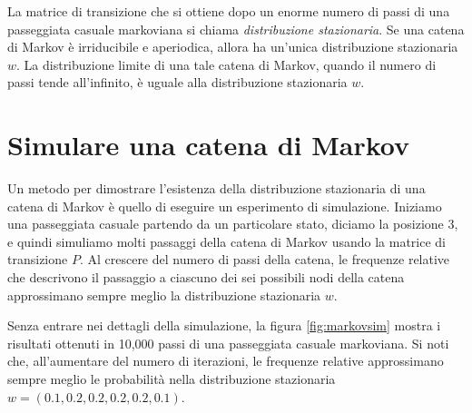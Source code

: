 \documentclass[
  11pt,
]{krantz}
\theoremstyle{definition}
\theoremstyle{definition}
\theoremstyle{definition}
\theoremstyle{definition}
\theoremstyle{remark}
\begin{document}
La matrice di transizione che si ottiene dopo un enorme numero di passi di una passeggiata casuale markoviana si chiama \emph{distribuzione stazionaria}. Se una catena di Markov è irriducibile e aperiodica, allora ha un'unica distribuzione stazionaria \(w\). La distribuzione limite di una tale catena di Markov, quando il numero di passi tende all'infinito, è uguale alla distribuzione stazionaria \(w\).

\hypertarget{simulare-una-catena-di-markov}{%
\section{Simulare una catena di Markov}\label{simulare-una-catena-di-markov}}

Un metodo per dimostrare l'esistenza della distribuzione stazionaria di una catena di Markov è quello di eseguire un esperimento di simulazione. Iniziamo una passeggiata casuale partendo da un particolare stato, diciamo la posizione 3, e quindi simuliamo molti passaggi della catena di Markov usando la matrice di transizione \(P\). Al crescere del numero di passi della catena, le frequenze relative che descrivono il passaggio a ciascuno dei sei possibili nodi della catena approssimano sempre meglio la distribuzione stazionaria \(w\).

Senza entrare nei dettagli della simulazione, la figura \ref{fig:markovsim} mostra i risultati ottenuti in 10,000 passi di una passeggiata casuale markoviana. Si noti che, all'aumentare del numero di iterazioni, le frequenze relative approssimano sempre meglio le probabilità nella distribuzione stazionaria \(w = (0.1, 0.2, 0.2, 0.2, 0.2, 0.1)\).
\end{document}
